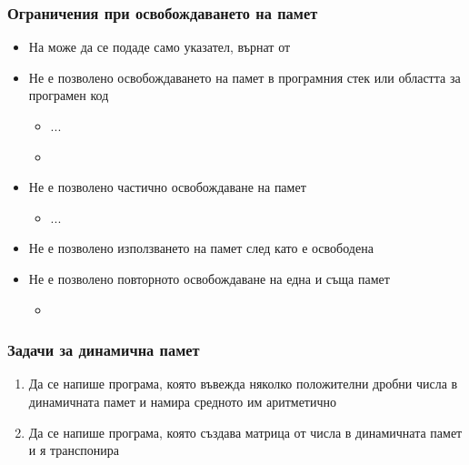 \documentclass{beamer}
\begin{document}
\begin{frame}[fragile]
  \frametitle{Ограничения при освобождаването на памет}
  
  \begin{itemize}[<+->]
  \item На  може да се подаде само указател, върнат от 
  \item Не е позволено освобождаването на памет в програмния стек или областта за програмен код
    \begin{itemize}
    \item {} ... 
    \item {}
    \end{itemize}
  \item Не е позволено частично освобождаване на памет
    \begin{itemize}
    \item {} ... 
    \end{itemize}
  \item Не е позволено използването на памет след като е освободена
  \item Не е позволено повторното освобождаване на една и съща памет
    \begin{itemize}
    \item {} 
    \end{itemize}
  \end{itemize}
\end{frame}

\begin{frame}
  \frametitle{Задачи за динамична памет}

  \begin{enumerate}[<+->]
  \item Да се напише програма, която въвежда няколко положителни дробни числа в динамичната памет и намира средното им аритметично
  \item Да се напише програма, която създава матрица от числа в динамичната памет и я транспонира
  \end{enumerate}
\end{frame}
\end{document}
